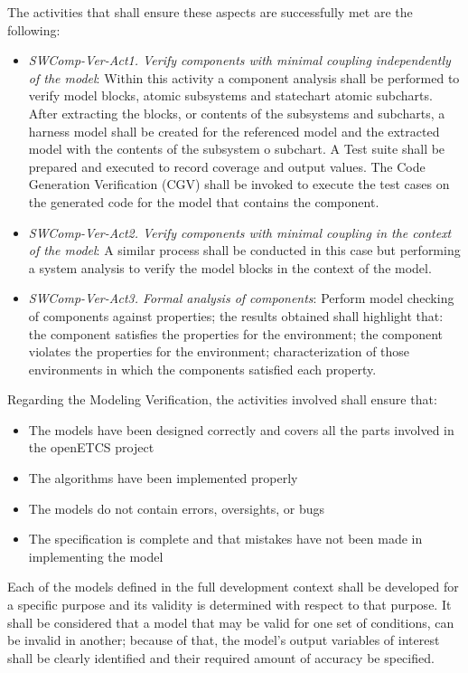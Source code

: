 \documentclass{template/openetcs_report}
\begin{document}
The activities that shall ensure these aspects are successfully met are the following:
\begin{itemize}
\item {\it SWComp-Ver-Act1. Verify components with minimal coupling independently of the model}: Within this activity a component analysis shall be performed to verify model blocks, atomic subsystems and statechart atomic subcharts. After extracting the blocks, or contents of the subsystems and subcharts, a harness model shall be created for the referenced model and the extracted model with the contents of the subsystem o subchart. A Test suite shall be prepared and executed to record coverage and output values. The Code Generation Verification (CGV) shall be invoked to execute the test cases on the generated code for the model that contains the component.
\item {\it SWComp-Ver-Act2. Verify components with minimal coupling in the context of the model}: A similar process shall be conducted in this case but performing a system analysis to verify the model blocks in the context of the model.   
\item {\it SWComp-Ver-Act3. Formal analysis of components}: Perform model checking of components against properties; the results obtained shall highlight that: the component satisfies the properties for the environment; the component violates the properties for
the environment; characterization of those environments in which the components
satisfied each property.
\end{itemize}

Regarding the Modeling Verification, the activities involved shall ensure that:
\begin{itemize}
\item The models have been designed correctly and covers all the parts involved in the openETCS project
\item The algorithms have been implemented properly
\item The models do not contain errors, oversights, or bugs
\item The specification is complete and that mistakes have not been made in implementing the model
\end{itemize}

Each of the models defined in the full development context shall be developed for a specific purpose and its validity is determined with respect to that purpose. It shall be considered that a model that may be valid for one set of conditions, can be invalid in another; because of that, the model’s output variables of interest shall be clearly identified and their required amount of accuracy be specified. 
\end{document}
